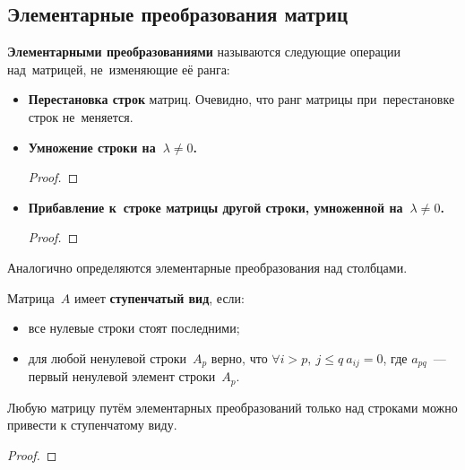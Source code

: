\subsection{Элементарные преобразования матриц}
\textbf{Элементарными преобразованиями} называются следующие операции над~матрицей, не~изменяющие её ранга:
\begin{itemize}
	\item\textbf{Перестановка строк} матриц.
	Очевидно, что ранг матрицы при~перестановке строк не~меняется.
	
	\item\textbf{Умножение строки на~$\lambda \neq 0$.}
	\begin{proof}
	
	\end{proof}
	
	\item\textbf{Прибавление к~строке матрицы другой строки, умноженной на~$\lambda \neq 0$.}
	\begin{proof}
	
	\end{proof}
\end{itemize}

Аналогично определяются элементарные преобразования над столбцами.

Матрица~$A$ имеет \textbf{ступенчатый вид}, если:
\begin{itemize}
	\item все нулевые строки стоят последними;
	\item для любой ненулевой строки~$A_p$ верно, что $\forall i > p, \ j \leqslant q \ a_{ij} = 0$, где $a_{pq}$~--- первый ненулевой элемент строки~$A_p$.
\end{itemize}

\begin{theorem}
Любую матрицу путём элементарных преобразований только над строками можно привести к ступенчатому виду.
\end{theorem}
\begin{proof}

\end{proof}